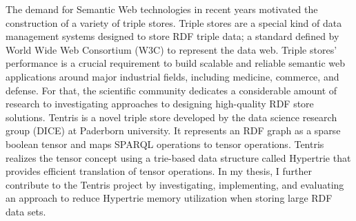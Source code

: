 The demand for Semantic Web technologies in recent years motivated the construction of a variety of triple stores.
Triple stores are a special kind of data management systems designed to store RDF triple data; a standard defined by 
World Wide Web Consortium (W3C) to represent the data web. 
Triple stores' performance is a crucial requirement to build scalable and reliable semantic web applications around major industrial fields, including medicine, commerce, and defense. For that, the scientific community dedicates a considerable amount of research to investigating approaches to designing high-quality RDF store solutions. Tentris is a novel triple store developed by the data science research group (DICE) at Paderborn university. It represents an RDF graph as a sparse boolean tensor and maps SPARQL operations to tensor operations. Tentris realizes the tensor concept using a trie-based data structure called Hypertrie that provides efficient translation of tensor operations. In my thesis, I further contribute to the Tentris project by investigating, implementing, and evaluating an approach to reduce Hypertrie memory utilization when storing large RDF data sets.